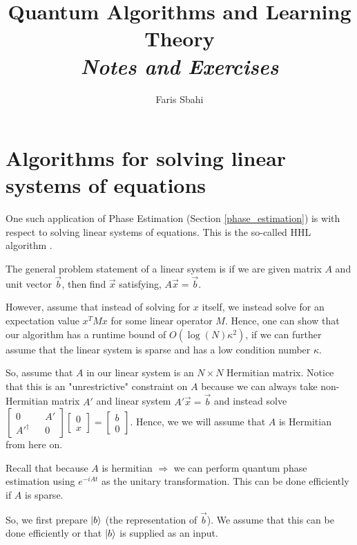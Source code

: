 \documentclass[11pt]{article}
\date{}
\title{Quantum Algorithms and Learning Theory\\\textit{Notes and Exercises}}
\author{Faris Sbahi}
\newcommand\0{\mathbf{0}}
\newcommand\<{\langle}
\renewcommand\>{\rangle}
\renewcommand\implies{\Rightarrow}
\begin{document}
\maketitle

\tableofcontents





\section{Algorithms for solving linear systems of equations}

One such application of Phase Estimation (Section \ref{phase_estimation}) is with respect to solving linear systems of equations. This is the so-called HHL algorithm \cite{lloyd2010quantum}.

The general problem statement of a linear system is if we are given matrix $A$ and unit vector $\vec{b}$, then find $\vec{x}$ satisfying, $A\vec{x} = \vec{b}$. 

However, assume that instead of solving for $x$ itself, we instead solve for an expectation value $x^T M x$ for some linear operator $M$. Hence, one can show that our algorithm has a runtime bound of $O(\log(N)\kappa ^{2})$, if we can further assume that the linear system is sparse and has a low condition number $\kappa$.

So, assume that $A$ in our linear system is an $N \times N$ Hermitian matrix. Notice that this is an "unrestrictive" constraint on $A$ because we can always take non-Hermitian matrix $A'$ and linear system $A' \vec{x} = \vec{b}$ and instead solve $\begin{bmatrix}
	0 && A' \\ A'^\dag && 0
\end{bmatrix} \begin{bmatrix} 0 \\ x \end{bmatrix} = \begin{bmatrix} b \\ 0 \end{bmatrix}$. Hence, we we will assume that $A$ is Hermitian from here on. 

Recall that because $A$ is hermitian $\implies$ we can perform quantum phase estimation using $e^{-iAt}$ as the unitary transformation. This can be done efficiently if $A$ is sparse.

So, we first prepare $\ket{b}$ (the representation of $\vec{b}$). We assume that this can be done efficiently or that $\ket{b}$ is supplied as an input.
\end{document}
